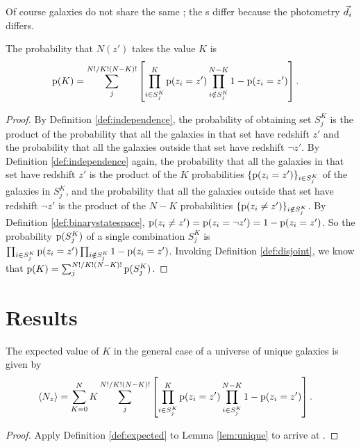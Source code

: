 Of course galaxies do not share the same \pzpdf; the \pzpdf s differ because the photometry $\vec{d}_{i}$ differs.
\begin{lemma}\label{lem:unique}
	The probability that $N(z')$ takes the value $K$ is 
	\begin{align}
	\eqlabel{eqn:general}
	\pr{K} &= \sum_{j}^{N! / K! (N - K)!} \left[ \prod_{i \in S^{K}_{j}}^{K} \pr{z_{i} = z'} \prod_{i \notin S^{K}_{j}}^{N - K} 1 - \pr{z_{i} = z'} \right] .
	\end{align}
\end{lemma}
\begin{proof}
	By Definition \ref{def:independence}, the probability of obtaining set $S^{K}_{j}$ is the product of the probability that all the galaxies in that set have redshift $z'$ and the probability that all the galaxies outside that set have redshift $\lnot z'$.
	By Definition \ref{def:independence} again, the probability that all the galaxies in that set have redshift $z'$ is the product of the $K$ probabilities $\{\mathrm{p}(z_{i} = z')\}_{i \in S^{K}_{j}}$ of the galaxies in $S^{K}_{j}$, and the probability that all the galaxies outside that set have redshift $\lnot z'$ is the product of the $N - K$ probabilities $\{\mathrm{p}(z_{i} \neq z')\}_{i \notin S^{K}_{j}}$.
	By Definition \ref{def:binarystatespace}, $\mathrm{p}(z_{i} \neq z') = \mathrm{p}(z_{i} = \lnot z') = 1 - \mathrm{p}(z_{i} = z')$.
	So the probability $\mathrm{p}(S^{K}_{j})$ of a single combination $S^{K}_{j}$ is $\prod_{i \in S^{K}_{j}} \mathrm{p}(z_{i} = z') \prod_{i \notin S^{K}_{j}} 1 - \mathrm{p}(z_{i} = z')$.
	Invoking Definition \ref{def:disjoint}, we know that $\mathrm{p}(K) = \sum_{j}^{N! / K! (N - K)!} \mathrm{p}(S^{K}_{j})$.
\end{proof}

\section{Results}

\begin{theorem}\label{thm:general}
	The expected value of $K$ in the general case of a universe of unique galaxies is given by
	\begin{align}
	\eqlabel{eqn:complete}
	\langle N_{z} \rangle &= \sum_{K = 0}^{N} K \sum_{j}^{N! / K! (N - K)!} \left[ \prod_{i \in S^{K}_{j}}^{K} \pr{z_{i} = z'} \prod_{i \in S^{K}_{j}}^{N - K} 1 - \pr{z_{i} = z'} \right].
	\end{align}
\end{theorem}
\begin{proof}
	Apply Definition \ref{def:expected} to Lemma \ref{lem:unique} to arrive at .
\end{proof}

